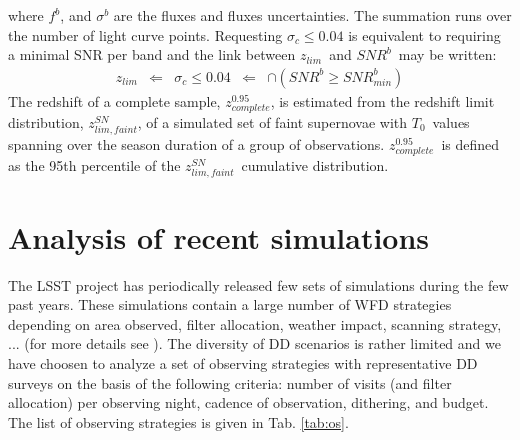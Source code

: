 \documentclass[skiphelvet,twocolumn]{lsstdescnote}
\newcommand{\snrb}{\mbox{$SNR^b$}}
\newcommand{\snrbmin}{\mbox{$SNR^b_{min}$}}
\newcommand{\daymax}{$T_0$}
\newcommand{\sigc}{\mbox{$\sigma_c$}}
\newcommand{\zlim}{\mbox{$z_{lim}$}}
\newcommand{\zlimfaint}{\mbox{$z_{lim,faint}^{SN}$}}
\newcommand{\zcompb}{\mbox{$z_{complete}^{0.95}$}}
\begin{document}
where $f^b$, and $\sigma^b$ are the fluxes and fluxes uncertainties. The summation runs over the number of light curve points. Requesting \sigc$\leq 0.04$ is equivalent to requiring a minimal SNR per band and the link between \zlim~and \snrb~may be written:
\begin{equation}
  \begin{aligned}
    \zlim &\Longleftarrow & \sigc \leq 0.04 & \Longleftarrow &\cap (\snrb \geq \snrbmin)
    \end{aligned}
 \label{eq:zlimsnr}
\end{equation}
The redshift of a complete sample, \zcompb, is estimated from the redshift limit distribution, \zlimfaint, of a simulated set of faint supernovae with \daymax~values spanning over the season duration of a group of observations. \zcompb~is defined as the 95th percentile of the \zlimfaint~cumulative distribution.


\section{Analysis of recent simulations}
\label{sec:analysis}
The LSST project has periodically released few sets of simulations during the few past years. These simulations contain a large number of WFD strategies depending on area observed, filter allocation, weather impact, scanning strategy, ... (for more details see ). The diversity of DD scenarios is rather limited and we have choosen to analyze a set of observing strategies with representative DD surveys on the basis of the following criteria: number of visits (and filter allocation) per observing night, cadence of observation, dithering, and budget. The list of observing strategies is given in Tab. \ref{tab:os}.
\end{document}
